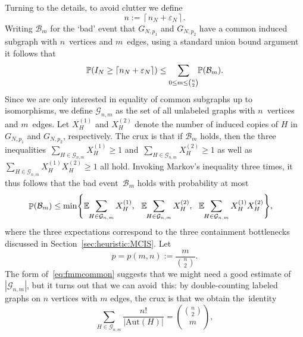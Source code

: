 \documentclass{article}
\newcommand{\eps}{\varepsilon}
\renewcommand{\Pr}{\mathbb{P}}
\newcommand{\E}{\mathbb{E}}
\newcommand{\cB}{\mathcal{B}}
\newcommand{\cG}{\mathcal{G}}
\newcommand\abs[1]{\left|#1\right|}
\newcommand\ceil[1]{\left\lceil #1 \right \rceil}
\newcommand{\Xone}{X^{(1)}}
\newcommand{\Xtwo}{X^{(2)}}
\newcommand{\nN}{n_N}
\newcommand{\eve}{\mathcal{B}}
\newcommand{\Aut}{\mathrm{Aut}}
\DeclareMathOperator{\pr}{\mathbb{P}}
\newcommand\Biggcpar[1]{\Biggl\{#1\Biggr\}}
\begin{document}
Turning to the details, to avoid clutter we define
\begin{equation}\label{eq:n:UB}
n:=\ceil{\nN+\eps_N}.
\end{equation}
Writing $\eve_m$ for the `bad' event that $G_{N,p_1}$ and $G_{N,p_2}$ have a common induced subgraph with $n$~vertices and $m$~edges,  
using a standard union bound argument it follows that
\begin{equation}\label{eq:In:UB}
\Pr(I_N \ge \ceil{\nN+\eps_N}) 
 \le \sum_{0\le m\le \binom{n}{2}} \hspace{-0.25em}\Pr(\eve_m).
\end{equation}
Since we are only interested in equality of common subgraphs up to isomorphisms, we define $\mathcal{G}_{n,m}$ as the set of all unlabeled graphs with $n$~vertices and $m$~edges. 
Let $\Xone_H$ and $\Xtwo_H$ denote the number of induced copies of $H$ in $G_{N,p_1}$ and $G_{N,p_2}$, respectively. 
The crux is that if $\eve_m$ holds, then the three inequalities~$\sum_{H\in \mathcal{G}_{n,m}} \Xone_H \ge 1$ and~$\sum_{H\in \mathcal{G}_{n,m}} \Xtwo_H \ge 1$ as well as~$\sum_{H\in \mathcal{G}_{n,m}} \Xone_H\Xtwo_H \ge 1$ all hold. 
Invoking Markov's inequality three times, it thus follows that the bad event~$\cB_m$ holds with probability at most
\begin{equation}\label{eq:fmmcommon}
\begin{split}
	\pr(\eve_m)& \le \min\Biggcpar{
\E\hspace{-0.25em}\sum_{H\in \mathcal{G}_{n,m}} \Xone_H, \ \
\E\hspace{-0.25em}\sum_{H\in \mathcal{G}_{n,m}} \Xtwo_H, \ \ 
\E\hspace{-0.25em}\sum_{H\in \mathcal{G}_{n,m}} \Xone_H\Xtwo_H} ,
\end{split}
\end{equation}
where the three expectations correspond to the three containment bottlenecks discussed in Section~\ref{sec:heuristic:MCIS}. 
Let 
\begin{equation}\label{def:density}
p=p(m,n):=\frac{m}{\binom{n}{2}}.
\end{equation}
The form of~\eqref{eq:fmmcommon} suggests that we might need a good estimate of~$|\mathcal{G}_{n,m}|$, but it turns out that we can avoid~this: 
by double-counting labeled graphs on $n$ vertices with $m$ edges, the crux is that we obtain the~identity
\begin{equation}
\label{eq:cgnmcardinality}
\sum_{H \in \cG_{n,m}} \frac{n!}{\abs{\Aut(H)}} = \binom{\binom{n}{2}}{m},
\end{equation}
\end{document}
